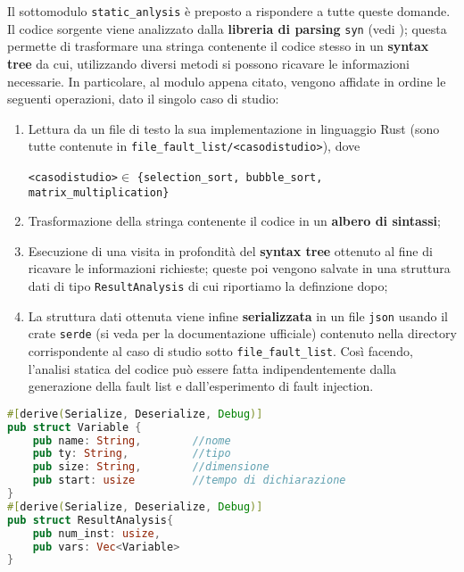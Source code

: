 \noindent
Il sottomodulo \texttt{static\_anlysis} è preposto a rispondere a tutte queste domande. Il codice sorgente viene analizzato dalla \textbf{libreria di parsing} \texttt{syn} (vedi \cite{syn}); questa permette di trasformare una stringa contenente il codice stesso in un \textbf{syntax tree} da cui, utilizzando diversi metodi si possono ricavare le informazioni necessarie. In particolare, al modulo appena citato, vengono affidate in ordine le seguenti operazioni, dato il singolo caso di studio: 
\begin{enumerate}
    \itemsep-0.3em
    \item Lettura da un file di testo la sua implementazione in linguaggio Rust (sono tutte contenute in \newline \texttt{file\_fault\_list/<casodistudio>}), dove 
    \begin{center}
        \texttt{<casodistudio>}$\in$ \texttt{\{selection\_sort, bubble\_sort, matrix\_multiplication\}}
    \end{center}
    \item Trasformazione della stringa contenente il codice in un \textbf{albero di sintassi}; 
    \item Esecuzione di una visita in profondità del  \textbf{syntax tree} ottenuto al fine di ricavare le informazioni richieste; queste poi vengono salvate in una struttura dati di tipo \texttt{ResultAnalysis} di cui riportiamo la definzione dopo;
    \item La struttura dati ottenuta viene infine \textbf{serializzata} in un file \texttt{json} usando il crate \texttt{serde} (si veda \cite{noauthor_serde_nodate} per la documentazione ufficiale) contenuto nella directory corrispondente al caso di studio sotto \texttt{file\_fault\_list}. Così facendo, l'analisi statica del codice può essere fatta indipendentemente dalla generazione della fault list e dall'esperimento di fault injection.
\end{enumerate}

\begin{lstlisting}[language=rust, style=boxed]
#[derive(Serialize, Deserialize, Debug)]
pub struct Variable {
    pub name: String,        //nome 
    pub ty: String,          //tipo       
    pub size: String,        //dimensione
    pub start: usize         //tempo di dichiarazione
}
#[derive(Serialize, Deserialize, Debug)]
pub struct ResultAnalysis{
    pub num_inst: usize,              
    pub vars: Vec<Variable>         
}
\end{lstlisting}

